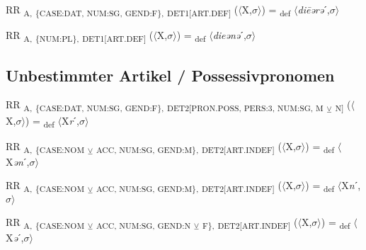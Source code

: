 {\begin{exe}
 RR \textsubscript{A,} \textsubscript{\{CASE:DAT, NUM:SG, GEND:F\},} \textsubscript{DET1[ART.DEF]} ($\langle$X,$\sigma $$\rangle$) = \textsubscript{def} $\langle$\textit{di\=eərə}ˊ,$\sigma $$\rangle$
\end{exe}

\begin{exe}
 RR \textsubscript{A,} \textsubscript{\{NUM:PL\},} \textsubscript{DET1[ART.DEF]} ($\langle$X,$\sigma $$\rangle$) = \textsubscript{def} $\langle$\textit{dieənə}ˊ,$\sigma $$\rangle$
\end{exe}

\subsection{Unbestimmter Artikel / Possessivpronomen}

\begin{exe}
 RR \textsubscript{A,} \textsubscript{\{CASE:DAT, NUM:SG, GEND:F\},} \textsubscript{DET2[PRON.POSS, PERS:3, NUM:SG, M} \textsubscript{${\veebar}$}\textsubscript{ N]} ($\langle$X,$\sigma $$\rangle$) = \textsubscript{def} $\langle$X\textit{r}ˊ,$\sigma $$\rangle$
\end{exe}

\begin{exe}
 RR \textsubscript{A,} \textsubscript{\{CASE:NOM} \textsubscript{${\veebar}$}\textsubscript{ ACC, NUM:SG, GEND:M\},} \textsubscript{DET2[ART.INDEF]} ($\langle$X,$\sigma $$\rangle$) = \textsubscript{def} $\langle$X\textit{ən}ˊ,$\sigma $$\rangle$
\end{exe}

\begin{exe}
 RR \textsubscript{A,} \textsubscript{\{CASE:NOM} \textsubscript{${\veebar}$}\textsubscript{ ACC, NUM:SG, GEND:M\},} \textsubscript{DET2[ART.INDEF]} ($\langle$X,$\sigma $$\rangle$) = \textsubscript{def} $\langle$X\textit{n}ˊ,$\sigma $$\rangle$
\end{exe}

\begin{exe}
 RR \textsubscript{A,} \textsubscript{\{CASE:NOM} \textsubscript{${\veebar}$}\textsubscript{ ACC, NUM:SG, GEND:N} \textsubscript{${\veebar}$}\textsubscript{ F\},} \textsubscript{DET2[ART.INDEF]} ($\langle$X,$\sigma $$\rangle$) = \textsubscript{def} $\langle$X\textit{ə}ˊ,$\sigma $$\rangle$
\end{exe}

}
